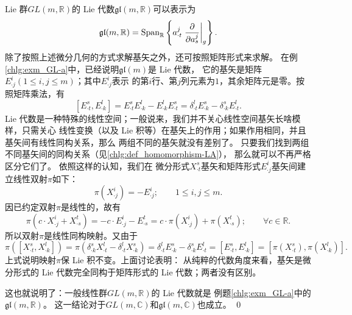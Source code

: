  Lie 群$GL(m,\mathbb{R})$的 Lie 代数$\mathfrak{gl}(m,\mathbb{R})$可以表示为
\begin{equation}\label{chlg:eqn_GLA-bases}
    \mathfrak{gl}(m,\mathbb{R}) = {\rm Span}_{\mathbb{R}}  \left\{ 
    a^j_{\cdot t} \left.\frac{\partial }{\partial a_{s}^j}\right|_{g} \right\}.
\end{equation}
除了按照上述微分几何的方式求解基矢之外，还可按照矩阵形式来求解。
在例\ref{chlg:exm_GL-a}中，已经说明$\mathfrak{gl}(m)$是 Lie 代数，
它的基矢是矩阵$E^i_{\cdot j}(1\leqslant i,j \leqslant m)$；其中$E^i_{\cdot j}$表示
的第$i$行、第$j$列元素为$1$，其余矩阵元是零。按照矩阵乘法，有
\begin{equation}\label{chlg:eqn_GLA-bases-matrix}
    [E_{\cdot t}^s, E_{\cdot k}^l]=E_{\cdot t}^s E_{\cdot k}^l-E_{\cdot k}^lE_{\cdot t}^s
    =\delta^l_{\cdot t} E^s_{\cdot k} -\delta^s_{\cdot k} E^l_{\cdot t}.
\end{equation}
 Lie 代数是一种特殊的线性空间；一般说来，我们并不关心线性空间基矢长啥模样，只需关心
线性变换（以及 Lie 积等）在基矢上的作用；如果作用相同，并且基矢间有线性同构关系，那么
两组不同的基矢就没有差别了。
只要我们找到两组不同基矢间的同构关系（见\ref{chlg:def_homomorphism-LA}），
那么就可以不再严格区分它们了。
依照这样的认知，我们在
微分形式$X_{\cdot t}^s$基矢和矩阵形式$E^i_{\cdot j}$基矢间建立线性双射$\pi$如下：
\begin{equation}
    \pi(X_{\cdot j}^i) = -E^i_{\cdot j} ; \qquad 1\leqslant i,j \leqslant m.
\end{equation}
因已约定双射$\pi$是线性的，故有
\begin{equation}
    \pi(c\cdot X_{\cdot j}^i+X_{\cdot s}^t) =- c\cdot E^i_{\cdot j} - E_{\cdot s}^t
    = c\cdot \pi (X^i_{\cdot j}) + \pi(X_{\cdot s}^t) ;    \qquad \forall c\in \mathbb{R}.
\end{equation}
所以双射$\pi$是线性同构映射。又由于
\begin{equation*}
    \pi\left([X_{\cdot t}^s, X_{\cdot k}^l]\right)
    = \pi\left(\delta^s_{\cdot k} X^l_{\cdot t} -\delta^l_{\cdot t} X^s_{\cdot k} \right)
    =\delta^l_{\cdot t} E^s_{\cdot k}-\delta^s_{\cdot k} E^l_{\cdot t}
    =[E_{\cdot t}^s, E_{\cdot k}^l] 
    =\left[\pi(X_{\cdot t}^s), \pi(X_{\cdot k}^l)\right] .
\end{equation*}
上式说明映射$\pi$保 Lie 积不变。上面讨论表明：
从纯粹的代数角度来看，基矢是微分形式的 Lie 代数完全同构于矩阵形式的 Lie 代数；两者没有区别。


这也就说明了：一般线性群$GL(m,\mathbb{R})$的 Lie 代数就是
例题\ref{chlg:exm_GL-a}中的$\mathfrak{gl}(m,\mathbb{R})$。
这一结论对于$GL(m,\mathbb{C})$和$\mathfrak{gl}(m,\mathbb{C})$也成立。
\qed

